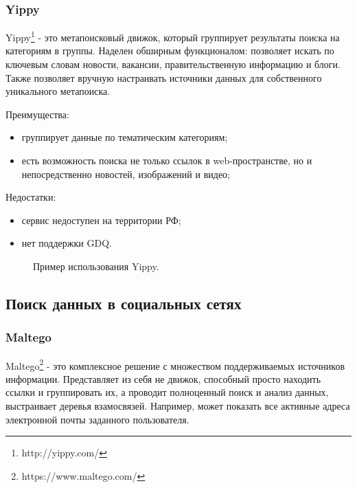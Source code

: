 \subsubsection{Yippy}
Yippy\footnote{http://yippy.com/} - это метапоисковый движок, который группирует результаты поиска на категориям в группы.
Наделен обширным функционалом: позволяет искать по ключевым словам новости, вакансии, правительственную информацию и блоги.
Также позволяет вручную настраивать источники данных для собственного уникального метапоиска. \cite{yippywikipedia}

Преимущества:
\begin{itemize}
    \item группирует данные по тематическим категориям;
    \item есть возможность поиска не только ссылок в web-пространстве, но и непосредственно новостей, изображений и видео;
\end{itemize}

Недостатки:
\begin{itemize}
    \item сервис недоступен на территории РФ;
    \item нет поддержки GDQ.
\end{itemize}

\begin{figure}[H]
    \caption{Пример использования Yippy.}
    \label{ris:image}
\end{figure}

\subsection{Поиск данных в социальных сетях}
\subsubsection{Maltego}
Maltego\footnote{https://www.maltego.com/} - это комплексное решение с множеством поддерживаемых источников информации.
Представляет из себя не движок, способный просто находить ссылки и группировать их, а проводит полноценный поиск и анализ
данных, выстраивает деревья взамосвязей. Например, может показать все активные адреса электронной почты заданного пользователя.
\cite{maltegohabr}

